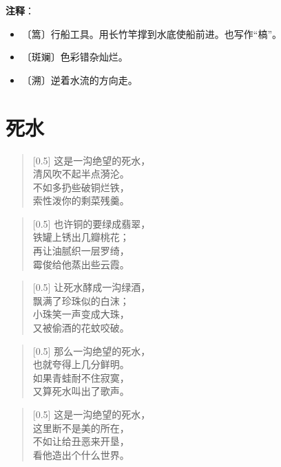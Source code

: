 \documentclass[12pt,UTF-8,openany]{ctexbook}
\begin{document}
\newpage

\textbf{注释}：

\vspace{-1em}

\begin{itemize}
    \setlength\itemsep{-0.2em}
    \item 〔篙〕行船工具。用长竹竿撑到水底使船前进。也写作“槁”。
    \item 〔斑斓〕色彩错杂灿烂。
    \item 〔溯〕逆着水流的方向走。
\end{itemize}

\chapter{死水}

\begin{normalsize}
    
    \begin{verse}[0.5\linewidth]
        这是一沟绝望的死水， \\
        清风吹不起半点漪沦。 \\
        不如多扔些破铜烂铁， \\
        索性泼你的剩菜残羹。
    \end{verse}
    
    
    \begin{verse}[0.5\linewidth]
        也许铜的要绿成翡翠， \\
        铁罐上锈出几瓣桃花； \\
        再让油腻织一层罗绮， \\
        霉俊给他蒸出些云霞。
    \end{verse}
    
    
    \begin{verse}[0.5\linewidth]
        让死水酵成一沟绿酒， \\
        飘满了珍珠似的白沫； \\
        小珠笑一声变成大珠， \\
        又被偷酒的花蚊咬破。
    \end{verse}
    
    
    \begin{verse}[0.5\linewidth]
        那么一沟绝望的死水， \\
        也就夸得上几分鲜明。 \\
        如果青蛙耐不住寂寞， \\
        又算死水叫出了歌声。
    \end{verse}
    
    
    \begin{verse}[0.5\linewidth]
        这是一沟绝望的死水， \\
        这里断不是美的所在， \\
        不如让给丑恶来开垦， \\
        看他造出个什么世界。
    \end{verse}
    
\end{normalsize}
\end{document}

